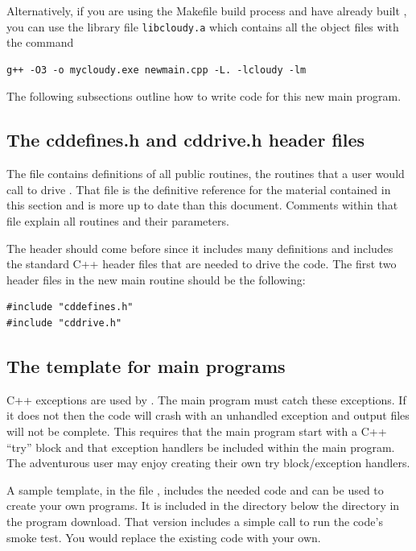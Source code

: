 Alternatively, if you are using the Makefile build process and have
already built \Cloudy, you can use the library file \verb|libcloudy.a|
which contains all the object files with the command
\begin{verbatim}
g++ -O3 -o mycloudy.exe newmain.cpp -L. -lcloudy -lm
\end{verbatim}

The following subsections outline how to write code for this new main program.

\subsection{The cddefines.h and cddrive.h header files}

The file  contains definitions of all public routines, the
routines that a user would call to drive \Cloudy.
That file is the definitive
reference for the material contained in this section and is more up to date
than this document.
Comments within that file explain all routines and
their parameters.

The header  should come before  since it includes
many definitions and includes the standard C++ header files that are needed
to drive the code.
The first two header files in the new main routine should
be the following:
\begin{verbatim}
#include "cddefines.h"
#include "cddrive.h"
\end{verbatim}

\subsection{The template for main programs }

C++ exceptions are used by \Cloudy.
The main program must catch these
exceptions.
If it does not then the code will crash with an unhandled
exception and output files will not be complete.
This requires that the
main program start with a C++ ``try'' block and that exception handlers
be included within the main program.
The adventurous user may enjoy creating
their own try block/exception handlers.

A sample template, in the file ,
includes the needed code and can be
used to create your own programs.
It is included in the  directory
below the  directory in the program download.
That version includes
a simple call to run the code's smoke test.
You would replace the existing
code with your own.

